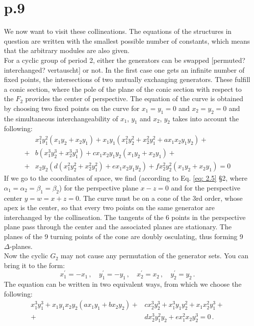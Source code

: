 \documentclass[leqno]{article}
\begin{document}
\section{p.9}
We now want to visit these collineations. The equations of the structures in question are written with the smallest possible number of constants, which means that the arbitrary modules are also given. \\
For a cyclic group of period 2, either the generators can be swapped [permuted? interchanged? vertauscht] or not. In the first case one gets an infinite number of fixed points, the intersections of two mutually exchanging generators. These fulfill a conic section, where the pole of the plane of the conic section with respect to the $F_2$ provides the center of perspective. The equation of the curve is obtained by choosing two fixed points on the curve for $x_1 = y_1 = 0$ and $x_2 = y_2 = 0$ and the simultaneous interchangeability of $x_1$, $y_1$ and $x_2 $, $y_2$ takes into account the following:
\begin{align}\label{eq: 3.1}
 & x_1^2 y_1^2 (x_1 y_2 + x_2 y_1) + x_1 y_1(x_1^2 y_2^2 + x_2^2 y_1^2 + a x_1 x_2 y_1 y_2) + \nonumber \\
 +& b(x_1^3 y_2^3 + x_2^3 y_1^3) + c x_1 x_2 y_1 y_2 (x_1 y_2 + x_2 y_1) +  \tag{1}\\
 +& x_2 y_2 (d(x_1^2 y_2^2 + x_2^2 y_1^2) + ex_1 x_2 y_1 y_2) + f x_2^2 y_2^2  (x_1 y_2 + x_2 y_1) =0 \nonumber
\end{align}
If we go to the coordinates of space, we find (according to Eq. \eqref{eq: 2.5} \S 2, where $\alpha_1 = \alpha_2 = \beta_1 = \beta_2$) for the perspective plane $x-z=0$ and for the perspective center $y=w=x+z=0$. The curve must be on a cone of the 3rd order, whose apex is the center, so that every two points on the same generator are interchanged by the collineation. The tangents of the 6 points in the perspective plane pass through the center and the associated planes are stationary. The planes of the 9 turning points of the cone are doubly osculating, thus forming 9 $\Delta$-planes. \\
Now the cyclic $G_2$ may not cause any permutation of the generator sets. You can bring it to the form:
\[
x_1^\prime = -x_1 \, , \quad y_1^\prime = - y_1 \, , \quad x_2^\prime = x_2 \, , \quad y_2^\prime = y_2 \, .   
\]
The equation can be written in two equivalent ways, from which we choose the following:
\begin{align}\label{eq: 3.2}
	x_1^3 y_1^3 + x_1 y_1 x_2 y_2 (ax_1 y_1 + b x_2 y_2) +& c x_2^3 y_2^3 +x_1^3 y_1 y_2^2 + x_1 x_2^2 y_1^3 + \tag{2} \\ 
	+& d x_2^3 y_1^2 y_2 + e x_1^2 x_2 y_2^3 = 0 \, .  \nonumber 
\end{align}
\end{document}
